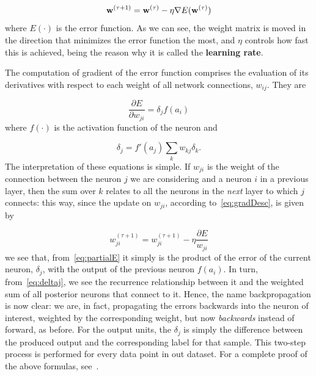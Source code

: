 \begin{equation}\label{eq:gradDesc}
	\mathbf{w}^{(\tau+1)} = \mathbf{w}^{(\tau)} - \eta \nabla E(\mathbf{w}^{(\tau)})
\end{equation}
where $E(\cdot)$ is the error function. As we can see, the weight matrix is moved in the direction that minimizes the error function the most, and $\eta$ controls how fast this is achieved, being the reason why it is called the \textbf{learning rate}.

The computation of gradient of the error function comprises the evaluation of its derivatives with respect to each weight of all network connections, $w_{ij}$. They are

\begin{equation}\label{eq:partialE}
	\frac{\partial E}{\partial w_{ji}} = \delta_j f(a_i)
\end{equation}
where $f(\cdot)$ is the activation function of the neuron and

\begin{equation}\label{eq:deltaj}
	\delta_j = f'(a_j) \sum_k w_{kj} \delta_k .
\end{equation}
The interpretation of these equations is simple. If $w_{ji}$ is the weight of the connection between the neuron $j$ we are considering and a neuron $i$ in a previous layer, then the sum over $k$ relates to all the neurons in the \emph{next} layer to which $j$ connects: this way, since the update on $w_{ji}$, according to~\ref{eq:gradDesc}, is given by

\begin{equation}\label{eq:update}
	w_{ji}^{(\tau+1)} = w_{ji}^{(\tau+1)} - \eta \frac{\partial E}{w_{ji}}
\end{equation}
we see that, from~\ref{eq:partialE}  it simply is the product of the error of the current neuron, $\delta_j$, with the output of the previous neuron $f(a_i)$. In turn, from~\ref{eq:deltaj}, we see the recurrence relationship between it and the weighted sum of all posterior neurons that connect to it. Hence, the name backpropagation is now clear: we are, in fact, propagating the errors backwards into the neuron of interest, weighted by the corresponding weight, but now \emph{backwards} instead of forward, as before. For the output units, the $\delta_j$ is simply the difference between the produced output and the corresponding label for that sample. This two-step process is performed for every data point in out dataset. %
For a complete proof of the above formulas, see~\citep[chap. 5.3.1]{Bishop2006}.

